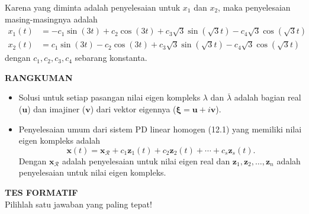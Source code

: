 \documentclass[a4paper]{article}
\theoremstyle{definisi}
\newcommand{\bfxi}{\boldsymbol{\xi}}
\numberwithin{equation}{section}
\begin{document}
\begin{enumerate}
    Karena yang diminta adalah penyelesaian untuk $x_1$ dan $x_2$, maka penyelesaian masing-masingnya adalah
    \begin{align*}
      x_1(t) &= -c_1\sin(3t) + c_2\cos(3t) + c_3\sqrt{3}\sin(\sqrt{3}t) - c_4\sqrt{3}\cos(\sqrt{3}t)\\
      x_2(t) &= c_1\sin(3t) - c_2\cos(3t) + c_3\sqrt{3}\sin(\sqrt{3}t)- c_4\sqrt{3}\cos(\sqrt{3}t)
    \end{align*}
    dengan $c_1, c_2, c_3, c_4$ sebarang konstanta.
  \end{enumerate}
  \newpage
  \textbf{RANGKUMAN}
  \begin{itemize}
    \item Solusi untuk setiap pasangan nilai eigen kompleks $\lambda$ dan $\overline{\lambda}$ adalah bagian real ($\mathbf{u}$) dan imajiner ($\mathbf{v}$) dari vektor eigennya ($\bfxi=\mathbf{u}+i\mathbf{v}$).
    \item Penyelesaian umum dari sistem PD linear homogen (12.1) yang memiliki nilai eigen kompleks adalah
    \[\mathbf{x}(t) = \mathbf{x}_\mathcal{R}+ c_1\mathbf{z}_1(t) + c_2\mathbf{z}_2(t) + \cdots + c_s\mathbf{z}_s(t).\]
    Dengan $\mathbf{x_\mathcal{R}}$ adalah penyelesaian untuk nilai eigen real dan $\mathbf{z}_1,\mathbf{z}_2,\dots,\mathbf{z}_n$ adalah penyelesaian untuk nilai eigen kompleks.
  \end{itemize}
  \newpage
  \noindent\textbf{TES FORMATIF}\\
  Pilihlah satu jawaban yang paling tepat!
\end{document}
